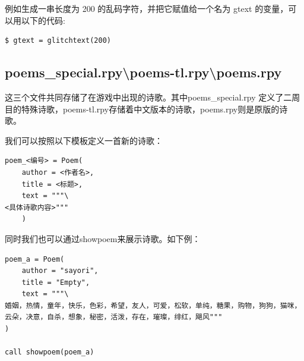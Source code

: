 \documentclass[../../Main.tex]{subfiles}
\begin{document}
例如生成一串长度为 200 的乱码字符，并把它赋值给一个名为 gtext 的变量，可以用以下的代码:
\begin{lstlisting}
$ gtext = glitchtext(200)
\end{lstlisting}

\subsection{poems\_special.rpy\textbackslash poems-tl.rpy\textbackslash poems.rpy}

这三个文件共同存储了在游戏中出现的诗歌。其中poems\_special.rpy 定义了二周目的特殊诗歌，poems-tl.rpy存储着中文版本的诗歌，poems.rpy则是原版的诗歌。

我们可以按照以下模板定义一首新的诗歌：
\begin{lstlisting}
poem_<编号> = Poem(
    author = <作者名>,
    title = <标题>,
    text = """\
<具体诗歌内容>"""
    )
\end{lstlisting}

同时我们也可以通过showpoem来展示诗歌。如下例：
\begin{lstlisting}
poem_a = Poem(
    author = "sayori",
    title = "Empty",
    text = """\
婚姻，热情，童年，快乐，色彩，希望，友人，可爱，松软，单纯，糖果，购物，狗狗，猫咪，云朵，决意，自杀，想象，秘密，活泼，存在，璀璨，绯红，飓风"""
)

call showpoem(poem_a)
\end{lstlisting}
\end{document}
